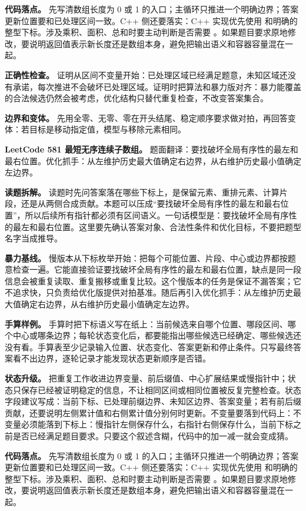\textbf{代码落点。} 先写清数组长度为 0 或 1 的入口；主循环只推进一个明确边界；答案更新位置要和已处理区间一致。C++ 侧还要落实：C++ 实现优先使用  和明确的整型下标。涉及乘积、面积、总和时要主动判断是否需要 。如果题目要求原地修改，要说明返回值表示新长度还是数组本身，避免把输出语义和容器容量混在一起。

\textbf{正确性检查。} 证明从区间不变量开始：已处理区域已经满足题意，未知区域还没有承诺，每次推进不会破坏已处理区域。证明时把算法和暴力版对齐：暴力能覆盖的合法候选仍然会被考虑，优化结构只替代重复检查，不改变答案集合。

\textbf{边界和变体。} 先用全零、无零、零在开头结尾、稳定顺序要求做对拍，再回答变体：若目标是移动指定值，模型与移除元素相同。

\noindent\textbf{LeetCode 581 最短无序连续子数组。} 题面翻译：要找破坏全局有序性的最左和最右位置。优化抓手：从左维护历史最大值确定右边界，从右维护历史最小值确定左边界。

\textbf{读题拆解。} 读题时先问答案落在哪些下标上，是保留元素、重排元素、计算片段，还是从两侧合成贡献。本题可以压成“要找破坏全局有序性的最左和最右位置”，所以后续所有指针都必须有区间语义。一句话模型是：要找破坏全局有序性的最左和最右位置。这里要先确认答案对象、合法性条件和优化目标，不要把题型名字当成推导。

\textbf{暴力基线。} 慢版本从下标枚举开始：把每个可能位置、片段、中心或边界都按题意检查一遍。它能直接验证要找破坏全局有序性的最左和最右位置，缺点是同一段信息会被重复读取、重复搬移或重复比较。这个慢版本的任务是保证不漏答案；它不追求快，只负责给优化版提供对拍基准。随后再引入优化抓手：从左维护历史最大值确定右边界，从右维护历史最小值确定左边界。

\textbf{手算样例。} 手算时把下标语义写在纸上：当前候选来自哪个位置、哪段区间、哪个中心或哪条边界；每轮状态变化后，都要能指出哪些候选已经确定、哪些候选还没有看。手算表至少记录输入位置、状态变化、答案更新和停止条件。只写最终答案看不出边界，逐轮记录才能发现状态更新顺序是否错。

\textbf{状态升级。} 把重复工作收进边界变量、前后缀值、中心扩展结果或慢指针中；状态只保存已经被证明稳定的信息，不让相同区间或相同位置被反复完整检查。状态字段建议写成：当前下标、已处理前缀边界、未知区边界、答案变量；若有前后缀贡献，还要说明左侧累计值和右侧累计值分别何时更新。不变量要落到代码上：不变量必须能落到下标上：慢指针左侧保存什么，右指针右侧保存什么，当前下标之前是否已经满足题目要求。只要这个叙述含糊，代码中的加一减一就会变成猜。

\textbf{代码落点。} 先写清数组长度为 0 或 1 的入口；主循环只推进一个明确边界；答案更新位置要和已处理区间一致。C++ 侧还要落实：C++ 实现优先使用  和明确的整型下标。涉及乘积、面积、总和时要主动判断是否需要 。如果题目要求原地修改，要说明返回值表示新长度还是数组本身，避免把输出语义和容器容量混在一起。

